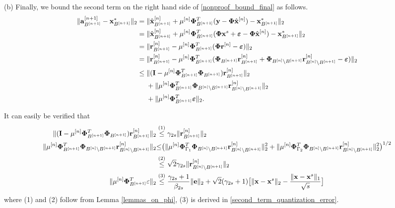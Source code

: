 \documentclass[11pt]{article}
\begin{document}
(b) Finally, we bound the second term on the right hand side of \ref{nonproof_bound_final} as follows.
\begin{equation}\label{last_term_main_theorem}
    \begin{split}
       \|{{\bf a}}_{B^{[n+1]}}^{[n+1]} - {{\bf x}}_{B^{[n+1]}}^{*} \|_2 &= \|{\hat{\bf x}}_{B^{[n+1]}}^{[n]} + \mu^{[n]}{\bf \Phi}_{B^{[n+1]}}^T({\bf y}-{\bf \Phi} \hat{{\bf x}}^{[n]}) - {{\bf x}}_{B^{[n+1]}}^{*} \|_2\\
        &= \|{\hat{\bf x}}_{B^{[n+1]}}^{[n]} + \mu^{[n]}{\bf \Phi}_{B^{[n+1]}}^T({\bf \Phi} {\bf x}^s + \boldsymbol{\varepsilon}-{\bf \Phi} \hat{\bf x}^{[n]}) - {{\bf x}}_{B^{[n+1]}}^{*} \|_2\\
         &= \|{{\bf r}}_{B^{[n+1]}}^{[n]} - \mu^{[n]}{\bf \Phi}_{B^{[n+1]}}^T({\bf \Phi} {\bf r}^{[n]}  -\boldsymbol{\varepsilon}) \|_2\\
         &= \|{{\bf r}}_{B^{[n+1]}}^{[n]} - \mu^{[n]}{\bf \Phi}_{B^{[n+1]}}^T({\bf \Phi}_{B^{[n+1]}}{\bf r}^{[n]}_{B^{[n+1]}} + {\bf \Phi}_{B^{[n]}\backslash B^{[n+1]}}{\bf r}^{[n]}_{B^{[n]}\backslash B^{[n+1]}}  - \boldsymbol{\varepsilon}) \|_2\\
         &\leq \|({\boldsymbol{\rm I}} - \mu^{[n]}{\bf \Phi}_{B^{[n+1]}}^T{\bf \Phi}_{B^{[n+1]}}){\bf r}^{[n]}_{B^{[n+1]}}\|_2\\
         &\ \ \ \ + \|\mu^{[n]}{\bf \Phi}_{B^{[n+1]}}^T{\bf \Phi}_{B^{[n]}\backslash B^{[n+1]}}{\bf r}^{[n]}_{B^{[n]}\backslash B^{[n+1]}}\|_2\\
         &\ \ \ \ + \|\mu^{[n]}{\bf \Phi}_{B^{[n+1]}}^T\boldsymbol{\varepsilon}\|_2.
    \end{split}
\end{equation}

It can easily be verified that
\begin{equation}\label{last_term_main_theorem2}
    \begin{split}
        \|({\boldsymbol{\rm I}} - \mu^{[n]}{\bf \Phi}_{B^{[n+1]}}^T{\bf \Phi}_{B^{[n+1]}}){\bf r}^{[n]}_{B^{[n+1]}}\|_2 &\overset{(1)}{\leq} \gamma_{2s}\| {\bf r}_{B^{[n+1]}}^{[n]}\|_2\\
        \|\mu^{[n]}{\bf \Phi}_{B^{[n+1]}}^T{\bf \Phi}_{B^{[n]}\backslash B^{[n+1]}}{\bf r}^{[n]}_{B^{[n]}\backslash B^{[n+1]}}\|_2 &{\leq} \big ({        \|\mu^{[n]}{\bf \Phi}_{\Gamma_1}^T{\bf \Phi}_{B^{[n]}\backslash B^{[n+1]}}{\bf r}^{[n]}_{B^{[n]}\backslash B^{[n+1]}}\|_2^2 +         \|\mu^{[n]}{\bf \Phi}_{\Gamma_2}^T{\bf \Phi}_{B^{[n]}\backslash B^{[n+1]}}{\bf r}^{[n]}_{B^{[n]}\backslash B^{[n+1]}}\|_2^2}\big )^{1/2}\\
        &\overset{(2)}{\leq}\sqrt{2}\gamma_{2s}\| {\bf r}^{[n]}_{B^{[n]}\backslash B^{[n+1]}}\|_2\\
        \|\mu^{[n]}{\bf \Phi}_{B^{[n+1]}}^T\varepsilon\|_2 &\overset{(3)}{\leq} \frac{\gamma_{2s}+1}{\beta_{2s}}\| {\bf e}\|_2 + \sqrt{2}(\gamma_{2s}+1) \big [ \|{\bf x} - {\bf x}^s\|_2 - \frac{\|{\bf x} - {\bf x}^s\|_1}{\sqrt{s}}\big]
    \end{split}
\end{equation}
where (1) and (2) follow from Lemma \ref{lemmas_on_phi}, (3) is derived in \ref{second_term_quantization_error}.
\end{document}
